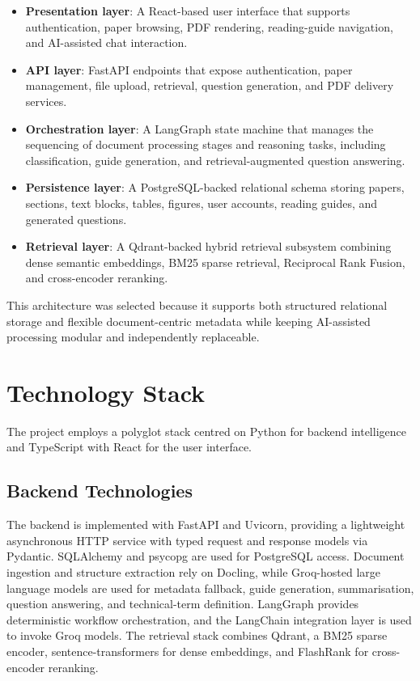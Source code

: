 \documentclass[12pt,a4paper]{report}
\begin{document}
\begin{itemize}
    \item \textbf{Presentation layer}: A React-based user interface that
    supports authentication, paper browsing, PDF rendering, reading-guide
    navigation, and AI-assisted chat interaction.

    \item \textbf{API layer}: FastAPI endpoints that expose authentication,
    paper management, file upload, retrieval, question generation, and PDF
    delivery services.

    \item \textbf{Orchestration layer}: A LangGraph state machine that manages
    the sequencing of document processing stages and reasoning tasks, including
    classification, guide generation, and retrieval-augmented question
    answering.

    \item \textbf{Persistence layer}: A PostgreSQL-backed relational schema
    storing papers, sections, text blocks, tables, figures, user accounts,
    reading guides, and generated questions.

    \item \textbf{Retrieval layer}: A Qdrant-backed hybrid retrieval subsystem
    combining dense semantic embeddings, BM25 sparse retrieval, Reciprocal
    Rank Fusion, and cross-encoder reranking.
\end{itemize}

This architecture was selected because it supports both structured relational
storage and flexible document-centric metadata while keeping AI-assisted
processing modular and independently replaceable.

\section{Technology Stack}

The project employs a polyglot stack centred on Python for backend intelligence
and TypeScript with React for the user interface.

\subsection{Backend Technologies}

The backend is implemented with FastAPI and Uvicorn, providing a lightweight
asynchronous HTTP service with typed request and response models via Pydantic.
SQLAlchemy and psycopg are used for PostgreSQL access. Document ingestion and
structure extraction rely on Docling, while Groq-hosted large language models
are used for metadata fallback, guide generation, summarisation, question
answering, and technical-term definition. LangGraph provides deterministic
workflow orchestration, and the LangChain integration layer is used to invoke
Groq models. The retrieval stack combines Qdrant, a BM25 sparse encoder,
sentence-transformers for dense embeddings, and FlashRank for cross-encoder
reranking.
\end{document}
